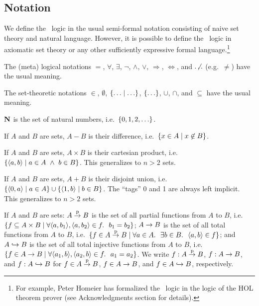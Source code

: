 \subsection{Notation}

We define the \MS\ logic in the usual semi-formal notation consisting of naive
set theory and natural language. However, it is possible to define the \MS\
logic in axiomatic set theory or any other sufficiently expressive formal
language.\footnote{For example, Peter Homeier has formalized the \MS\ logic in
the logic of the HOL theorem prover (see Acknowledgments section for details).}

The (meta) logical notations $=$, $\forall$, $\exists$, $\neg$, $\wedge$,
$\vee$, $\Rightarrow$, $\Leftrightarrow$, and $\ \not\!\!\!\!\ldots$ (e.g.\
$\neq$) have the usual meaning.

The set-theoretic notations $\in$, $\emptyset$, $\{\ldots\mid\ldots\}$,
$\{\ldots\}$, $\cup$, $\cap$, and $\subseteq$ have the usual meaning.

$\mathbf{N}$ is the set of natural numbers, i.e.\ $\{0,1,2,\ldots\}$.


If $A$ and $B$ are sets, $A-B$ is their difference, i.e.\ $\{x\in
A\mid x\not\in B\}$.

If $A$ and $B$ are sets, $A\times B$ is their cartesian product, i.e.\
$\{\langle a,b\rangle\mid a\in A\ \wedge\  b\in B\}$. This generalizes to $n>2$ sets.

If $A$ and $B$ are sets, $A+B$ is their disjoint union, i.e.\
$\{\langle0,a\rangle\mid a\in A\}\cup\{\langle1,b\rangle\mid b\in B\}$. The ``tags'' 0
and 1 are always left implicit. This generalizes to $n>2$ sets.

If $A$ and $B$ are sets: $A\stackrel{\mathrm{p}}{\to}B$ is the set of all partial functions from
$A$ to $B$, i.e.\ $\{f\subseteq A\times
B\mid\forall\langle a,b_1\rangle,\langle a,b_2\rangle\in f.\ \ b_1=b_2\}$; $A\to B$ is the
set of all total functions from $A$ to $B$, i.e.\
$\{f\in A\stackrel{\mathrm{p}}{\to}B\mid\forall a\in A.\ \ \exists b\in B.\ \ \langle a,b\rangle\in f\}$;
and $A\hookrightarrow B$ is the set of all total injective functions from $A$ to
$B$, i.e.\ $\{f\in A\to B\mid\forall\langle a_1,b\rangle,\langle a_2,b\rangle\in
f.\ \ a_1=a_2\}$.  We write $f:A\stackrel{\mathrm{p}}{\to}B$, $f:A\to B$,
and $f:A\hookrightarrow B$ for $f\in A\stackrel{\mathrm{p}}{\to}B$, $f\in A\to B$,
and $f\in A\hookrightarrow B$, respectively.

